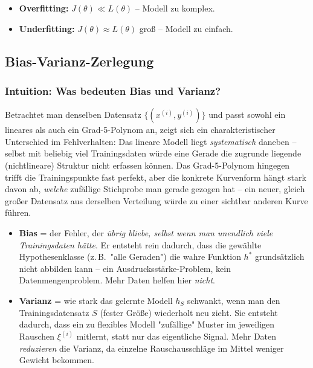 \documentclass[11pt]{article}
\theoremstyle{csthm}
\theoremstyle{csdef}
\begin{document}
\begin{itemize}
  \item \textbf{Overfitting:} $J(\theta) \ll L(\theta)$ -- Modell zu komplex.
  \item \textbf{Underfitting:} $J(\theta) \approx L(\theta)$ groß -- Modell
        zu einfach.
\end{itemize}

\subsection{Bias-Varianz-Zerlegung}

\subsubsection*{Intuition: Was bedeuten Bias und Varianz?}

Betrachtet man denselben Datensatz $\{(x^{(i)},y^{(i)})\}$ und passt sowohl
ein lineares als auch ein Grad-5-Polynom an, zeigt sich ein charakteristischer
Unterschied im Fehlverhalten: Das lineare Modell liegt \emph{systematisch}
daneben -- selbst mit beliebig viel Trainingsdaten würde eine Gerade die
zugrunde liegende (nichtlineare) Struktur nicht erfassen können. Das
Grad-5-Polynom hingegen trifft die Trainingspunkte fast perfekt, aber die
konkrete Kurvenform hängt stark davon ab, \emph{welche} zufällige
Stichprobe man gerade gezogen hat -- ein neuer, gleich großer Datensatz aus
derselben Verteilung würde zu einer sichtbar anderen Kurve führen.

\begin{itemize}
  \item \textbf{Bias} = der Fehler, der \emph{übrig bliebe, selbst wenn man
        unendlich viele Trainingsdaten hätte}. Er entsteht rein dadurch, dass
        die gewählte Hypothesenklasse (z.\,B.\ "alle Geraden") die wahre
        Funktion $h^*$ grundsätzlich nicht abbilden kann -- ein
        Ausdrucksstärke-Problem, kein Datenmengenproblem. Mehr Daten helfen
        hier \emph{nicht}.
  \item \textbf{Varianz} = wie stark das gelernte Modell $h_S$ schwankt, wenn
        man den Trainingsdatensatz $S$ (fester Größe) wiederholt neu zieht.
        Sie entsteht dadurch, dass ein zu flexibles Modell "zufällige"
        Muster im jeweiligen Rauschen $\xi^{(i)}$ mitlernt, statt nur das
        eigentliche Signal. Mehr Daten \emph{reduzieren} die Varianz, da
        einzelne Rauschausschläge im Mittel weniger Gewicht bekommen.
\end{itemize}
\end{document}
